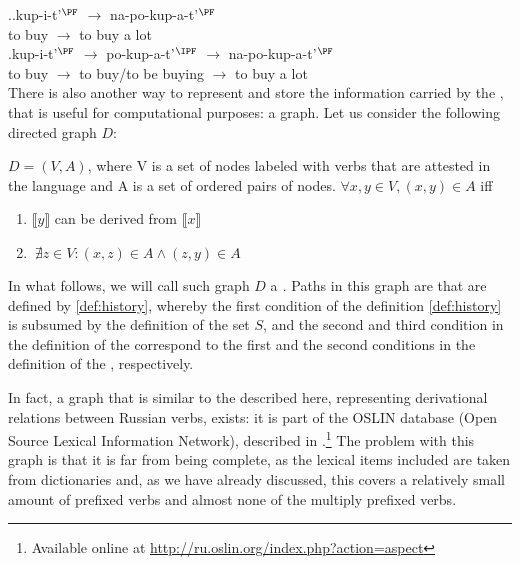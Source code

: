 \ex.\label{ex:napokupat}\ag.\label{ex:napokupat1}kup-i-t'$^\PF$ $\rightarrow$ na-po-kup-a-t'$^\PF$\\	
{to buy} $\rightarrow$ {to buy a lot}\\
\bg.\label{ex:napokupat2}kup-i-t'$^\PF$ $\rightarrow$ po-kup-a-t'$^\IPF$ $\rightarrow$ na-po-kup-a-t'$^\PF$\\
{to buy} $\rightarrow$ {to buy/to be buying} $\rightarrow$ {to buy a lot}\\

There is also another way to represent and store the information carried by the , that is useful for computational purposes: a graph. Let us consider the following directed graph $D$: 
\begin{definition}\label{def:chain}
$D = (V,A)$, where V is a set of nodes labeled with verbs that are attested in the language and A is a set of ordered pairs of nodes. $\forall x,y \in V, (x,y) \in A$ iff 
\begin{enumerate}
\item $\llbracket y \rrbracket$ can be derived from $\llbracket x \rrbracket$
\item $~\nexists z \in V: (x,z) \in A \wedge (z,y) \in A$
\end{enumerate}
\end{definition}

In what follows, we will call such graph $D$ a \textit{.} Paths in this graph are  that are defined by \ref{def:history}, whereby the first condition of the definition \ref{def:history} is subsumed by the definition of the set $S$, and the second and third condition in the definition of the  correspond to the first and the second conditions in the definition of the , respectively.

In fact, a graph that is similar to the  described here, representing derivational relations between Russian verbs, exists: it is part of the OSLIN database (Open Source Lexical Information Network), described in \cite{Borik:12}.\footnote{Available online at \url{http://ru.oslin.org/index.php?action=aspect}} The problem with this graph is that it is far from being complete, as the lexical items included are taken from dictionaries and, as we have already discussed, this covers a relatively small amount of prefixed verbs and almost none of the multiply prefixed verbs.

